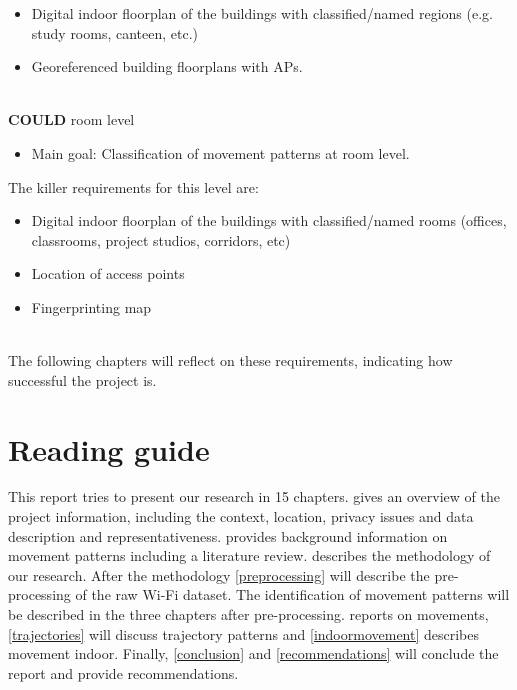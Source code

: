 \begin{itemize}
\item Digital indoor floorplan of the buildings with classified/named regions (e.g. study rooms, canteen, etc.)
\item Georeferenced building floorplans with APs.\\\\
\end{itemize}
\textbf{COULD} room level
\begin{itemize}
\item {\color{black!50}Main goal: Classification of movement patterns at room level.}
\end{itemize}
The killer requirements for this level are:
\begin{itemize}
\item {\color{black!50}Digital indoor floorplan of the buildings with classified/named rooms (offices, classrooms, project studios, corridors, etc)}
\item {\color{black!50}Location of access points}
\item {\color{black!50}Fingerprinting map}\\\\
\end{itemize}
The following chapters will reflect on these requirements, indicating how successful the project is.
\pagebreak

\section{Reading guide}
This report tries to present our research in 15 chapters.  gives an overview of the project information, including the context, location, privacy issues and data description and representativeness.  provides background information on movement patterns including a literature review.  describes the methodology of our research. After the methodology \cref{preprocessing} will describe the pre-processing of the raw Wi-Fi dataset. The identification of movement patterns will be described in the three chapters after pre-processing.  reports on movements, \cref{trajectories} will discuss trajectory patterns and \cref{indoormovement} describes movement indoor. Finally, \cref{conclusion} and \cref{recommendations} will conclude the report and provide recommendations.

